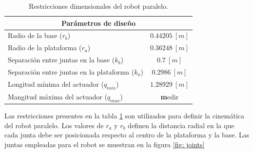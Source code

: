 \begin{table}[h]
\centering
\begin{tabular}{lc}

\multicolumn{2}{c}{Parámetros de diseño} \\ \hline
Radio de la base ($r_b$) & $0.44205 \ [m]$ \\ 
Radio de la plataforma ($r_a$) & $0.36248 \ [m]$ \\ 
Separación entre juntas en la base ($k_b$) & $0.7 \ [m]$ \\ 
Separación entre juntas en la plataforma ($k_a$) & $0.2986 \ [m]$ \\ 
Longitud mínima del actuador ($q_{min}$) & $1.28929 \ [m]$ \\ 
Mangitud máxima del actuador ($q_{max}$) & \textbf medir \\ 
\end{tabular}
\caption{Restricciones dimensionales del robot paralelo.}
\label{tab: restricciones}
\end{table}

Las restricciones presentes en la tabla \ref{tab: restricciones}
son utilizados para definir la cinemática del robot paralelo.
Los valores de $r_a$ y $r_b$ definen la 
distancia radial en la que cada junta debe ser 
posicionada respecto al centro de la plataforma y la base.
Las juntas empleadas para el robot se muestran 
en la figura \ref{fig: joints}

